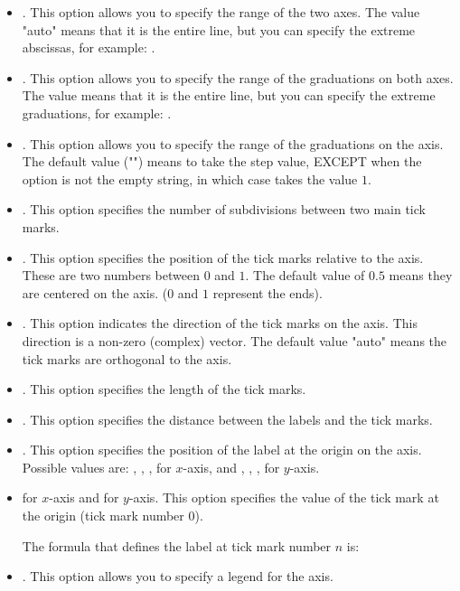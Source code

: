 \begin{itemize}
\begin{itemize}
        \item {}. This option allows you to specify the range of the two axes. The value "auto" means that it is the entire line, but you can specify the extreme abscissas, for example: .
        \item {}. This option allows you to specify the range of the graduations on both axes. The value  means that it is the entire line, but you can specify the extreme graduations, for example: .
        \item {}. This option allows you to specify the range of the graduations on the axis. The default value ("") means to take the step value, EXCEPT when the  option is not the empty string, in which case  takes the value $1$.
        \item {}. This option specifies the number of subdivisions between two main tick marks.
        \item {}. This option specifies the position of the tick marks relative to the axis. These are two numbers between $0$ and $1$. The default value of $0.5$ means they are centered on the axis. ($0$ and $1$ represent the ends).
        \item {}. This option indicates the direction of the tick marks on the axis. This direction is a non-zero (complex) vector. The default value "auto" means the tick marks are orthogonal to the axis.
        \item {}. This option specifies the length of the tick marks.
        \item {}. This option specifies the distance between the labels and the tick marks.
        \item {}. This option specifies the position of the label at the origin on the axis. Possible values ​​are:  , , ,  for $x$-axis, and , , ,  for $y$-axis.
        \item {} for $x$-axis and  for $y$-axis. This option specifies the value of the tick mark at the origin (tick mark number $0$).
    
    The formula that defines the label at tick mark number $n$ is: 
    
        \item {}. This option allows you to specify a legend for the axis.


\end{itemize}
\end{itemize}
